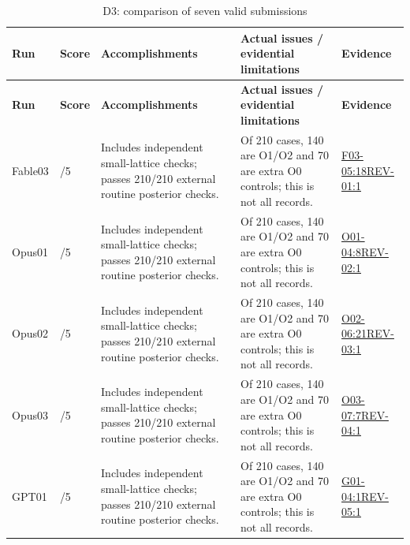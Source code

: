 \documentclass[11pt,a4paper]{article}
\begin{document}
{\fontsize{9.0}{12.6}\selectfont
\setlength{\tabcolsep}{2.5pt}
\begin{longtable}{>{\raggedright\arraybackslash}p{}>{\raggedright\arraybackslash}p{}>{\raggedright\arraybackslash}p{}>{\raggedright\arraybackslash}p{}>{\raggedright\arraybackslash}p{}}
\caption{D3: comparison of seven valid submissions}\\
\toprule
\textbf{Run} & \textbf{Score} & \textbf{Accomplishments} & \textbf{Actual issues /\allowbreak{} evidential limitations} & \textbf{Evidence}\tabularnewline
\midrule
\endfirsthead
\toprule
\textbf{Run} & \textbf{Score} & \textbf{Accomplishments} & \textbf{Actual issues /\allowbreak{} evidential limitations} & \textbf{Evidence}\tabularnewline
\midrule
\endhead
{}Fable03 & 5/\allowbreak{}5 & Includes independent small-lattice checks; passes 210/\allowbreak{}210 external routine posterior checks. & Of 210 cases,\allowbreak{} 140 are O1/\allowbreak{}O2 and 70 are extra O0 controls; this is not all records. & \hyperref[src:F03-05]{F03-05:18}\newline \hyperref[src:REV-01]{REV-01:1}\tabularnewline
{}Opus01 & 5/\allowbreak{}5 & Includes independent small-lattice checks; passes 210/\allowbreak{}210 external routine posterior checks. & Of 210 cases,\allowbreak{} 140 are O1/\allowbreak{}O2 and 70 are extra O0 controls; this is not all records. & \hyperref[src:O01-04]{O01-04:8}\newline \hyperref[src:REV-02]{REV-02:1}\tabularnewline
{}Opus02 & 5/\allowbreak{}5 & Includes independent small-lattice checks; passes 210/\allowbreak{}210 external routine posterior checks. & Of 210 cases,\allowbreak{} 140 are O1/\allowbreak{}O2 and 70 are extra O0 controls; this is not all records. & \hyperref[src:O02-06]{O02-06:21}\newline \hyperref[src:REV-03]{REV-03:1}\tabularnewline
{}Opus03 & 5/\allowbreak{}5 & Includes independent small-lattice checks; passes 210/\allowbreak{}210 external routine posterior checks. & Of 210 cases,\allowbreak{} 140 are O1/\allowbreak{}O2 and 70 are extra O0 controls; this is not all records. & \hyperref[src:O03-07]{O03-07:7}\newline \hyperref[src:REV-04]{REV-04:1}\tabularnewline
{}GPT01 & 5/\allowbreak{}5 & Includes independent small-lattice checks; passes 210/\allowbreak{}210 external routine posterior checks. & Of 210 cases,\allowbreak{} 140 are O1/\allowbreak{}O2 and 70 are extra O0 controls; this is not all records. & \hyperref[src:G01-04]{G01-04:1}\newline \hyperref[src:REV-05]{REV-05:1}\tabularnewline

\end{longtable}}
\end{document}
